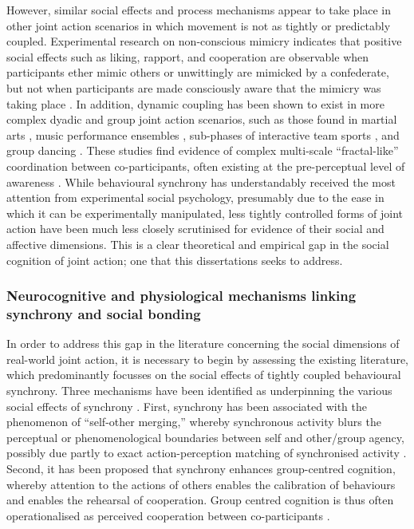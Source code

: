 However, similar social effects and process mechanisms appear to take place in other joint action scenarios in which movement is not as tightly or predictably coupled.  Experimental research on non-conscious mimicry indicates that positive social effects such as liking, rapport, and cooperation are observable when participants ether mimic others or unwittingly are mimicked by a confederate, but not when participants are made consciously aware that the mimicry was taking place \citep{Bos2008,Lakin2008}.  In addition, dynamic coupling has been shown to exist in more complex dyadic and group joint action scenarios, such as those found in martial arts \citep{Schmidt2011}, music performance ensembles \citep{Demos2014}, sub-phases of interactive team sports \citep{Duarte2013}, and group dancing \citep{Chauvigne2017}.
These studies find evidence of complex multi-scale ``fractal-like'' coordination between co-participants, often existing at the pre-perceptual level of awareness \citep{Schmidt2011,Riley2011,Fusaroli2013}.
While behavioural synchrony has understandably received the most attention from experimental social psychology, presumably due to the ease in which it can be experimentally manipulated, less tightly controlled forms of joint action have been much less closely scrutinised for evidence of their social and affective dimensions\citep[but see]{Marsh2009,Miles2009}.  This is a clear theoretical and empirical gap in the social cognition of joint action; one that this dissertations seeks to address.

\subsubsection{Neurocognitive and physiological mechanisms linking synchrony and social bonding}
In order to address this gap in the literature concerning the social dimensions of real-world joint action, it is necessary to begin by assessing the existing literature, which predominantly focusses on the social effects of tightly coupled behavioural synchrony. Three mechanisms have been identified as underpinning the various social effects of synchrony \citep{Lang2017,Mogan2017}.  First, synchrony has been associated with the phenomenon of ``self-other merging,'' whereby synchronous activity blurs the perceptual or phenomenological boundaries between self and other/group agency, possibly due partly to exact action-perception matching of synchronised activity \citep{Hove2008}.  Second, it has been proposed that synchrony enhances group-centred cognition, whereby attention to the actions of others enables the calibration of behaviours and enables the rehearsal of cooperation. Group centred cognition is thus often operationalised as perceived cooperation between co-participants \citep{Reddish2013}.

